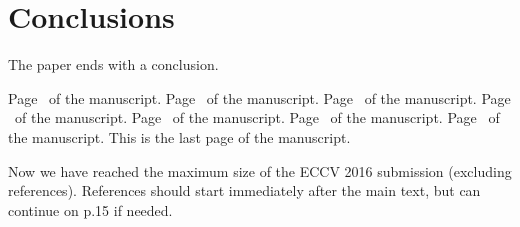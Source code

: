 \documentclass[runningheads]{llncs}
\begin{document}
\section{Conclusions}

The paper ends with a conclusion. 


\clearpage\mbox{}Page \thepage\ of the manuscript.
\clearpage\mbox{}Page \thepage\ of the manuscript.
\clearpage\mbox{}Page \thepage\ of the manuscript.
\clearpage\mbox{}Page \thepage\ of the manuscript.
\clearpage\mbox{}Page \thepage\ of the manuscript.
\clearpage\mbox{}Page \thepage\ of the manuscript.
\clearpage\mbox{}Page \thepage\ of the manuscript.
This is the last page of the manuscript.
\par\vfill\par
Now we have reached the maximum size of the ECCV 2016 submission (excluding references).
References should start immediately after the main text, but can continue on p.15 if needed.

\clearpage
\end{document}
